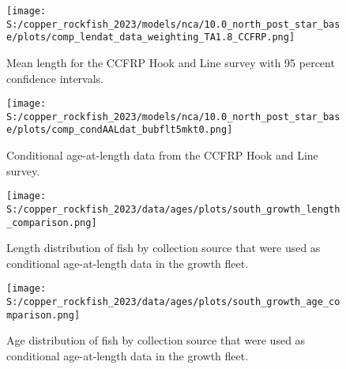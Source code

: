 \documentclass[11pt,
  letterpaper,
]{article}
\begin{document}
\pagebreak

\begin{figure}
{\centering
\texttt{[image: S:/copper\_rockfish\_2023/models/nca/10.0\_north\_post\_star\_base/plots/comp\_lendat\_data\_weighting\_TA1.8\_CCFRP.png]}
}
\caption{Mean length for the CCFRP Hook and Line survey with 95 percent confidence intervals.\label{fig:ccfrp-mean-len-data}}
\end{figure}

\pagebreak

\begin{figure}
{\centering
\texttt{[image: S:/copper\_rockfish\_2023/models/nca/10.0\_north\_post\_star\_base/plots/comp\_condAALdat\_bubflt5mkt0.png]}
}
\caption{Conditional age-at-length data from the CCFRP Hook and Line survey.\label{fig:ccfrp-age-data}}
\end{figure}

\pagebreak

\pagebreak

\pagebreak

\pagebreak

\pagebreak

\pagebreak

\pagebreak

\begin{figure}
{\centering
\texttt{[image: S:/copper\_rockfish\_2023/data/ages/plots/south\_growth\_length\_comparison.png]}
}
\caption{Length distribution of fish by collection source that were used as conditional age-at-length data in the growth fleet.\label{fig:growth-len-dist}}
\end{figure}

\pagebreak

\begin{figure}
{\centering
\texttt{[image: S:/copper\_rockfish\_2023/data/ages/plots/south\_growth\_age\_comparison.png]}
}
\caption{Age distribution of fish by collection source that were used as conditional age-at-length data in the growth fleet.\label{fig:growth-age-dist}}
\end{figure}
\end{document}
